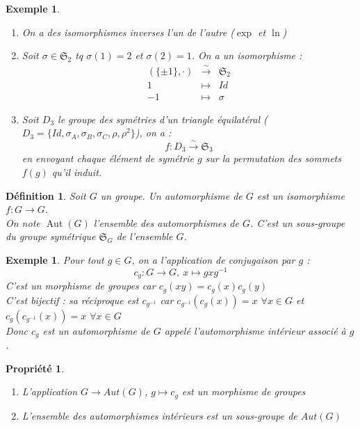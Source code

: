 \documentclass[a4paper, oneside]{report}
\theoremstyle{break}
\newtheorem{defi}[thm]{Définition}
\newtheorem{propr}[thm]{Propriété}
\newtheorem{exem}[thm]{Exemple}
\newcommand{\mdg}{morphisme de groupes }
\newcommand{\auts}{automorphismes }
\newcommand{\fong}{\overset{\sim}{\rightarrow}}
\renewcommand{\S}{\mathfrak{S}}
\DeclareMathOperator{\Aut}{Aut}
\begin{document}
\begin{exem}
	\begin{enumerate}
		\item On a des isomorphismes inverses l'un de l'autre ($\exp$ et $\ln$)
		\item Soit $\sigma \in \S_2$ tq $\sigma(1)=2$ et $\sigma(2)=1$. On a un isomorphisme :
		$$\begin{array}{lll}
		(\{\pm 1\}, \cdot)&\fong & \S_2\\
		1&\mapsto &Id\\
		-1&\mapsto&\sigma
		\end{array}$$
		
		\item Soit $D_3$ le groupe des symétries d'un triangle équilatéral ($D_3=\{Id, \sigma_A, \sigma_B, \sigma_C, \rho, \rho^2\}$), on a : 
		$$f:D_3 \fong \S_3$$
		en envoyant chaque élément de symétrie $g$ sur la permutation des sommets $f(g)$ qu'il induit.
	\end{enumerate}
\end{exem}

\begin{defi}
	Soit $G$ un groupe. Un automorphisme de $G$ est un isomorphisme $f:G\rightarrow G$.\\
	On note $\Aut(G)$ l'ensemble des automorphismes de $G$. C'est un sous-groupe du groupe symétrique $\S_G$ de l'ensemble $G$.
\end{defi}

\begin{exem}
	Pour tout $g\in G$, on a l'application de conjugaison par $g$ :
	$$c_g : G \rightarrow G,~x\mapsto gxg^{-1}$$
	C'est un \mdg  car $c_g(xy)=c_g(x)c_g(y)$\\
	C'est bijectif : sa réciproque est $c_{g^{-1}}$ car $c_{g^{-1}}(c_g(x))=x$ 
	$\forall x\in G$ et $c_g(c_{g^{-1}}(x)) = x$ $ \forall x\in G$\\
	Donc $c_g$ est un automorphisme de $G$ appelé l'automorphisme 
	intérieur associé à $g$.
\end{exem}

\begin{propr}
	\begin{enumerate}
		\item L'application $G\rightarrow Aut(G)$, $g\mapsto c_g$ est un \mdg
		\item L'ensemble des \auts intérieurs est un sous-groupe de $Aut(G)$
	\end{enumerate}
\end{propr}
\end{document}
